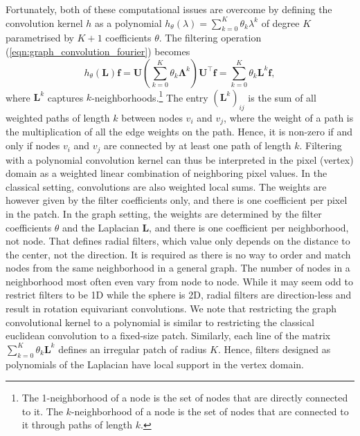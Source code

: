 \documentclass[final,twocolumn,3p,times,sort&compress]{elsarticle}
\newcommand{\eqnref}[1]{(\ref{eqn:#1})}
\renewcommand{\b}[1]{{\bm{#1}}}   %
\newcommand{\1}{\b{1}}              %
\newcommand{\0}{\b{0}}              %
\renewcommand{\L}{\b{L}}
\newcommand{\U}{\b{U}}
\newcommand{\f}{\b{f}}
\newcommand{\trans}{^\intercal}
\newcommand{\bLambda}{\b{\Lambda}}
\begin{document}
Fortunately, both of these computational issues are overcome by defining the convolution kernel $h$ as a polynomial $h_\theta(\lambda) = \sum_{k=0}^K \theta_k \lambda^k$ of degree $K$ parametrised by $K+1$ coefficients $\theta$.
The filtering operation \eqnref{graph_convolution_fourier} becomes
\begin{equation} \label{eqn:graph_convolution_monomial}
	h_\theta(\L) \f =  \U \left(\sum_{k=0}^K \theta_k \bLambda^k \right) \U\trans \f = \sum_{k=0}^K \theta_k \L^k \f,
\end{equation}
where $\L^k$ captures $k$-neighborhoods.\footnote{The 1-neighborhood of a node is the set of nodes that are directly connected to it. The $k$-neighborhood of a node is the set of nodes that are connected to it through paths of length $k$.}
The entry $(\L^k)_{ij}$ is the sum of all weighted paths of length $k$ between nodes $v_i$ and $v_j$, where the weight of a path is the multiplication of all the edge weights on the path.
Hence, it is non-zero if and only if nodes $v_i$ and $v_j$ are connected by at least one path of length $k$.
Filtering with a polynomial convolution kernel can thus be interpreted in the pixel (vertex) domain as a weighted linear combination of neighboring pixel values.
In the classical setting, convolutions are also weighted local sums.
The weights are however given by the filter coefficients only, and there is one coefficient per pixel in the patch.
In the graph setting, the weights are determined by the filter coefficients $\theta$ and the Laplacian $\L$, and there is one coefficient per neighborhood, not node.
That defines radial filters, which value only depends on the distance to the center, not the direction.
It is required as there is no way to order and match nodes from the same neighborhood in a general graph.
The number of nodes in a neighborhood most often even vary from node to node.
While it may seem odd to restrict filters to be 1D while the sphere is 2D, radial filters are direction-less and result in rotation equivariant convolutions.
We note that restricting the graph convolutional kernel to a polynomial is similar to restricting the classical euclidean convolution to a fixed-size patch.
Similarly, each line of the matrix $\sum_{k=0}^K \theta_k \L^k$ defines an irregular patch of radius $K$.
Hence, filters designed as polynomials of the Laplacian have local support in the vertex domain.
\end{document}
